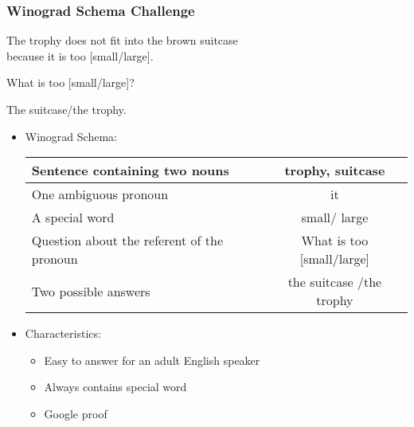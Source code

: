 \documentclass[c,8pt,xcolor...,x11names]{beamer}
\begin{document}
\begin{frame}
\frametitle{Winograd Schema Challenge}
	\begin{itemize}
	\small{
	\item[S:] The trophy does not fit into the brown suitcase\\ because \alert{it} is too \alert{[small/large]}.
	\item[Q:] What is too [small/large]?
	\item[A:] The suitcase/the trophy. }
\end{itemize} 
\begin{itemize}
	\item Winograd Schema: 
	\begin{center}
	\begin{tabular}{ l | c }
		Sentence containing two nouns &  \alert{trophy}, \alert{suitcase} \\
		\hline 
		One ambiguous pronoun & \alert{it} \\  
		\hline
		A special word & \alert{small}/\alert{ large}\\
		\hline
		Question about the referent of the pronoun & What is too [\alert{small}/\alert{large}]\\
		\hline
		Two possible answers & \alert{the suitcase} /\alert{the trophy}\\
	\end{tabular}
	\end{center}


		 \item Characteristics:
		  \begin{itemize}
		\normalsize
		\item Easy to answer for an adult English speaker
		\item Always contains \alert{special word}
		\item Google proof
	\end{itemize}
\end{itemize}
\end{frame}
\end{document}
